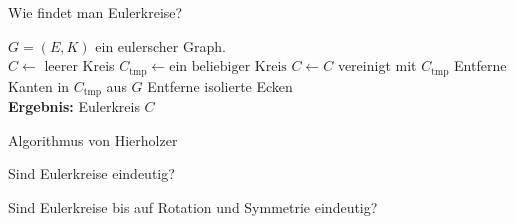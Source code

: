 \begin{frame}{Wie findet man Eulerkreise?}
    \begin{algorithm}[H]
        \begin{algorithmic}
            \Require $G = (E, K)$ ein eulerscher Graph.
            \\
            \State $C \gets$ leerer Kreis
            \Repeat
                \State $C_\text{tmp} \gets \text{ein beliebiger Kreis}$ 
                \State $C \gets C $ vereinigt mit $C_\text{tmp}$
                \State Entferne Kanten in $C_\text{tmp}$ aus $G$
                \State Entferne isolierte Ecken
            \\
            \State \textbf{Ergebnis:} Eulerkreis $C$
        \end{algorithmic}
    \caption{Algorithmus von Hierholzer}
    \label{alg:Hierholzer}
    \end{algorithm}
\end{frame}

\begin{frame}{Sind Eulerkreise eindeutig?}
    \begin{center}
        \large Sind Eulerkreise bis auf Rotation und Symmetrie eindeutig?
    \end{center}
\end{frame}

